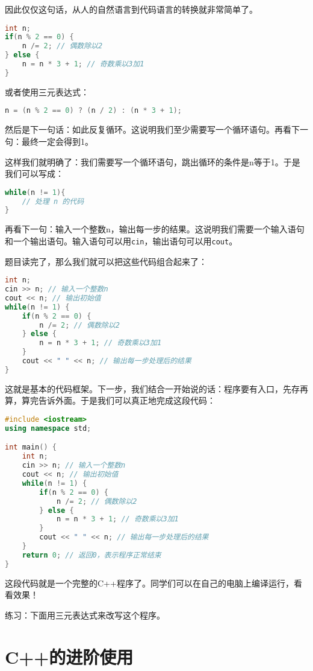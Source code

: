 \documentclass[../main.tex]{subfiles}
\begin{document}
因此仅仅这句话，从人的自然语言到代码语言的转换就非常简单了。
\begin{lstlisting}[language=C++]
int n;
if(n % 2 == 0) {
    n /= 2; // 偶数除以2
} else {
    n = n * 3 + 1; // 奇数乘以3加1
}
\end{lstlisting}

或者使用三元表达式：
\begin{lstlisting}[language=C++]
n = (n % 2 == 0) ? (n / 2) : (n * 3 + 1);
\end{lstlisting}

然后是下一句话：如此反复循环。这说明我们至少需要写一个循环语句。再看下一句：最终一定会得到1。

这样我们就明确了：我们需要写一个循环语句，跳出循环的条件是n等于1。于是我们可以写成：
\begin{lstlisting}[language=C++]
while(n != 1){
    // 处理 n 的代码
}
\end{lstlisting}

再看下一句：输入一个整数n，输出每一步的结果。这说明我们需要一个输入语句和一个输出语句。输入语句可以用\texttt{cin}，输出语句可以用\texttt{cout}。

题目读完了，那么我们就可以把这些代码组合起来了：
\begin{lstlisting}[language=C++]
int n;
cin >> n; // 输入一个整数n
cout << n; // 输出初始值
while(n != 1) {
    if(n % 2 == 0) {
        n /= 2; // 偶数除以2
    } else {
        n = n * 3 + 1; // 奇数乘以3加1
    }
    cout << " " << n; // 输出每一步处理后的结果
}
\end{lstlisting}
这就是基本的代码框架。下一步，我们结合一开始说的话：程序要有入口，先存再算，算完告诉外面。于是我们可以真正地完成这段代码：
\begin{lstlisting}[language=C++]
#include <iostream>
using namespace std;

int main() {
    int n;
    cin >> n; // 输入一个整数n
    cout << n; // 输出初始值
    while(n != 1) {
        if(n % 2 == 0) {
            n /= 2; // 偶数除以2
        } else {
            n = n * 3 + 1; // 奇数乘以3加1
        }
        cout << " " << n; // 输出每一步处理后的结果
    }
    return 0; // 返回0，表示程序正常结束
}
\end{lstlisting}
这段代码就是一个完整的C++程序了。同学们可以在自己的电脑上编译运行，看看效果！

练习：下面用三元表达式来改写这个程序。

\section{C++的进阶使用}
\end{document}
